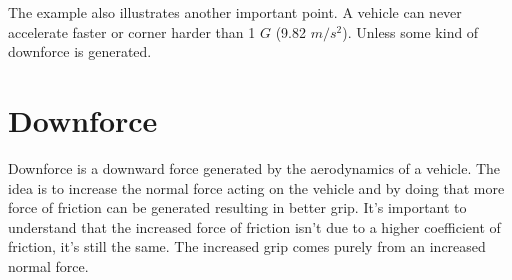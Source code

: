 The example also illustrates another important point. A vehicle can never accelerate faster or corner harder than 1 $ G $ (9.82 $ m/s^2 $). Unless some kind of downforce is generated. 

\section{Downforce}
Downforce is a downward force generated by the aerodynamics of a vehicle. The idea is to increase the normal force acting on the vehicle and by doing that more force of friction can be generated resulting in better grip. It's important to understand that the increased force of friction isn't due to a higher coefficient of friction, it's still the same. The increased grip comes purely from an increased normal force.